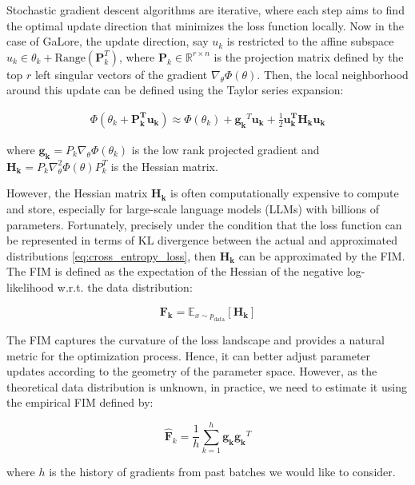 Stochastic gradient descent algorithms are iterative, where each step aims to find the optimal update direction that minimizes the loss function locally. Now in the case of GaLore, the update direction, say \(u_{k}\) is restricted to the affine subspace \(u_{k} \in {\theta_{k}} + \text{Range} \left(\mathbf{P}_{k}^{T}\right)\), where \(\mathbf{P}_{k} \in \mathbb{R}^{r\times n}\) is the projection matrix defined by the top \(r\) left singular vectors of the gradient \(\nabla_{\theta} \Phi(\theta)\). Then, the local neighborhood around this update can be defined using the Taylor series expansion:

\begin{eqnarray}
\Phi(\theta_{k} + \mathbf{P_{k}^T u_{k}}) \approx \Phi(\theta_{k}) + \mathbf{g_{k}}^{T}\mathbf{u_{k}} + \frac{1}{2} \mathbf{u_{k}^{T} \mathbf{H_{k}}  u_{k}}
\label{eq:taylor_series_expansion}
\end{eqnarray}

where \(\mathbf{g_{k}} = P_{k}\nabla_{\theta} \Phi(\theta_{k})\) is the low rank projected gradient and \(\mathbf{H_{k}} = P_{k}\nabla^2_{\theta} \Phi(\theta) P_{k}^T\) is the Hessian matrix.

However, the Hessian matrix \(\mathbf{H_{k}}\) is often computationally expensive to compute and store, especially for large-scale language models (LLMs) with billions of parameters. Fortunately, precisely under the condition that the loss function can be represented in terms of KL divergence between the actual and approximated distributions \ref{eq:cross_entropy_loss}, then \(\mathbf{H_{k}}\) can be approximated by the FIM. The FIM is defined as the expectation of the Hessian of the negative log-likelihood w.r.t. the data distribution:

\[
\mathbf{F_{k}} = \mathbb{E}_{x \sim p_{\text{data}}} \left[ \mathbf{H_{k}} \right]
\]

The FIM captures the curvature of the loss landscape and provides a natural metric for the optimization process. Hence, it can better adjust parameter updates according to the geometry of the parameter space. However, as the theoretical data distribution is unknown, in practice, we need to estimate it using the empirical FIM \citep{martensNewPerspectiveNatural2014} defined by:

\[
\mathbf{\hat{F}}_{k} = \frac{1}{h} \sum_{k=1}^{h} \mathbf{g_{k}} \mathbf{g_{k}}^{T}
\]

where \(h\) is the history of gradients from past batches we would like to consider.

